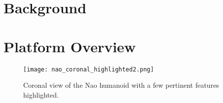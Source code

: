 \section{Background}

\section{Platform Overview}

\begin{figure}
	\centering
	\texttt{[image: nao\_coronal\_highlighted2.png]}
	\caption
	{Coronal view of the Nao humanoid with a few pertinent features highlighted. }
	\label{fig:nao_diagram1}
\end{figure}

